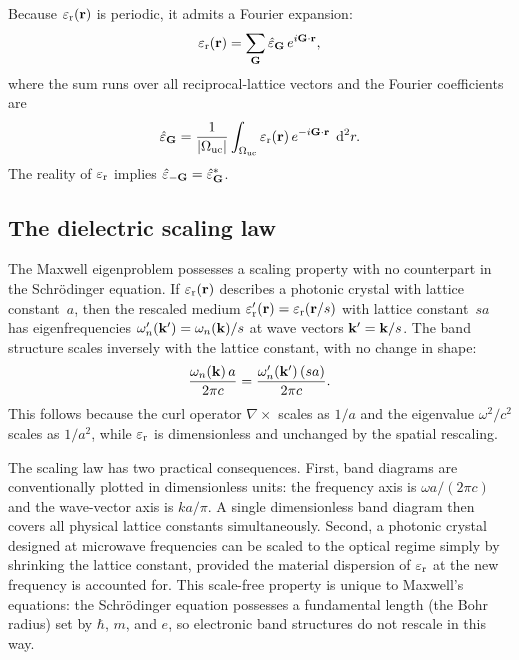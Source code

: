 Because $\varepsilon_{\mathrm{r}}(\mathbf{r})$ is periodic, it admits a Fourier expansion:
\begin{equation}
 \varepsilon_{\mathrm{r}}(\mathbf{r}) = \sum_{\mathbf{G}} \hat{\varepsilon}_{\mathbf{G}}\,e^{i\mathbf{G}\cdot\mathbf{r}},
 \label{eq:fourier-eps}
\end{equation}
where the sum runs over all reciprocal-lattice vectors and the Fourier
coefficients are
\begin{equation}
 \hat{\varepsilon}_{\mathbf{G}}
 = \frac{1}{|\Omega_{\mathrm{uc}}|}
 \int_{\Omega_{\mathrm{uc}}} \varepsilon_{\mathrm{r}}(\mathbf{r})\,e^{-i\mathbf{G}\cdot\mathbf{r}}\;\mathop{}\!\mathrm{d}^2 r.
 \label{eq:fourier-coeffs}
\end{equation}
The reality of $\varepsilon_{\mathrm{r}}$ implies
$\hat{\varepsilon}_{-\mathbf{G}} = \hat{\varepsilon}_{\mathbf{G}}^*$.

\subsection{The dielectric scaling law}
\label{ssec:dielectric-scaling}

The Maxwell eigenproblem possesses a scaling property with no counterpart
in the Schr\"odinger equation. If $\varepsilon_{\mathrm{r}}(\mathbf{r})$ describes a photonic crystal
with lattice constant~$a$, then the rescaled medium
$\varepsilon_{\mathrm{r}}'(\mathbf{r}) = \varepsilon_{\mathrm{r}}(\mathbf{r}/s)$ with lattice constant~$sa$ has eigenfrequencies
$\omega_n'(\mathbf{k}') = \omega_n(\mathbf{k})/s$ at wave vectors $\mathbf{k}' = \mathbf{k}/s$.
The band structure scales inversely with the lattice constant, with no
change in shape:
\begin{equation}
 \frac{\omega_n(\mathbf{k})\,a}{2\pi c}
 = \frac{\omega_n'(\mathbf{k}')\,(sa)}{2\pi c}.
 \label{eq:dielectric-scaling}
\end{equation}
This follows because the curl operator $\nabla\times$ scales as $1/a$
and the eigenvalue $\omega^2/c^2$ scales as $1/a^2$, while $\varepsilon_{\mathrm{r}}$ is
dimensionless and unchanged by the spatial rescaling.

The scaling law has two practical consequences. First, band diagrams
are conventionally plotted in dimensionless units: the frequency axis is
$\omega a/(2\pi c)$ and the wave-vector axis is $ka/\pi$.
A single dimensionless band diagram then covers all physical lattice
constants simultaneously. Second, a photonic crystal designed at microwave
frequencies can be scaled to the optical regime simply by shrinking the
lattice constant, provided the material dispersion of $\varepsilon_{\mathrm{r}}$ at the new
frequency is accounted for. This scale-free property is unique to
Maxwell's equations: the Schr\"odinger equation possesses a fundamental
length (the Bohr radius) set by $\hbar$, $m$, and $e$, so electronic
band structures do not rescale in this way.

